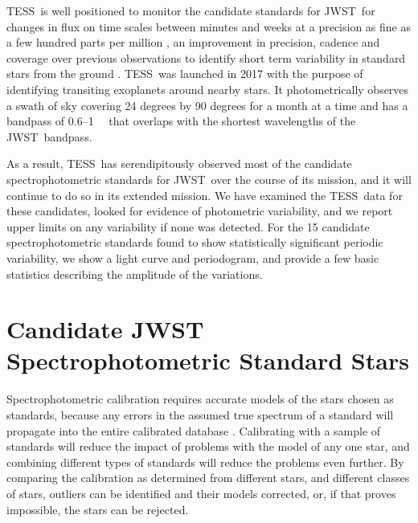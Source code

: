 \documentclass[twocolumn, linenumbers]{aastex631}
\newcommand{\webb}{JWST}
\newcommand{\tess}{TESS}
\newcommand{\mum}{\ifmmode{\rm \mu m}\else{$\mu$m}\fi}
\begin{document}
\tess\ is well positioned to monitor the candidate standards for \webb\ for changes in flux on time scales between minutes and weeks at a precision as fine as a few hundred parts per million \citep{Ricker2015}, an improvement in precision, cadence and coverage over previous observations to identify short term variability in standard stars from the ground \citep[e.g.,][]{Marinoni2016}.  \tess\ was launched in 2017 with the purpose of identifying transiting exoplanets around nearby stars.  It photometrically observes a swath of sky covering 24 degrees by 90 degrees for a month at a time and has a bandpass of 0.6--1~\mum\ \citep{Ricker2015} that overlaps with the shortest wavelengths of the \webb\ bandpass.

As a result, \tess\ has serendipitously observed most of the candidate spectrophotometric standards for \webb\ over the course of its mission, and it will continue to do so in its extended mission.  We have examined the \tess\ data for these candidates, looked for evidence of photometric variability, and we report upper limits on any variability if none was detected.  For the 15 candidate spectrophotometric standards found to show statistically significant periodic variability, we show a light curve and periodogram, and provide a few basic statistics describing the amplitude of the variations. 


\section{Candidate JWST Spectrophotometric Standard Stars} 
\label{sec:targets}

Spectrophotometric calibration requires accurate models of the stars chosen as standards, because any errors in the assumed true spectrum of a standard will propagate into the entire calibrated database \citep[e.g.][]{Cohen1992, Price2002, Sloan2015}.  Calibrating with a sample of standards will reduce the impact of problems with the model of any one star, and combining different types of standards will reduce the problems even further.  By comparing the calibration as determined from different stars, and different classes of stars, outliers can be identified and their models corrected, or, if that proves impossible, the stars can be rejected.

\end{document}
